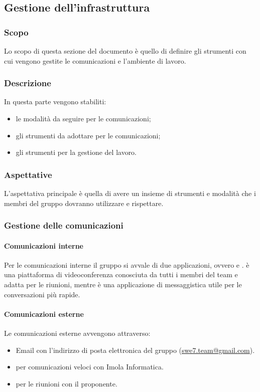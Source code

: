 \subsection{Gestione dell'infrastruttura}
\subsubsection{Scopo}
Lo scopo di questa sezione del documento è quello di definire gli strumenti con cui vengono gestite le 
comunicazioni e l'ambiente di lavoro.

\subsubsection{Descrizione}
In questa parte vengono stabiliti:
\begin{itemize}
    \item le modalità da seguire per le comunicazioni;
    \item gli strumenti da adottare per le comunicazioni;
    \item gli strumenti per la gestione del lavoro.
\end{itemize}

\subsubsection{Aspettative}
L'aspettativa principale è quella di avere un insieme di strumenti e modalità che i membri del gruppo 
dovranno utilizzare e rispettare.

\subsubsection{Gestione delle comunicazioni} 
\paragraph{Comunicazioni interne} \hfill \break
Per le comunicazioni interne il gruppo si avvale di due applicazioni, ovvero  e 
.  è una piattaforma di videoconferenza conosciuta da tutti i membri del 
team e adatta per le riunioni, mentre  è una applicazione di messaggistica utile per le 
conversazioni più rapide.

\paragraph{Comunicazioni esterne} \hfill \break
Le comunicazioni esterne avvengono attraverso:
\begin{itemize}
    \item Email con l'indirizzo di posta elettronica del gruppo 
        (\href{mailto:swe7.team@gmail.com}{swe7.team@gmail.com}).
    \item {} per comunicazioni veloci con Imola Informatica.
    \item {} per le riunioni con il proponente.
\end{itemize}

